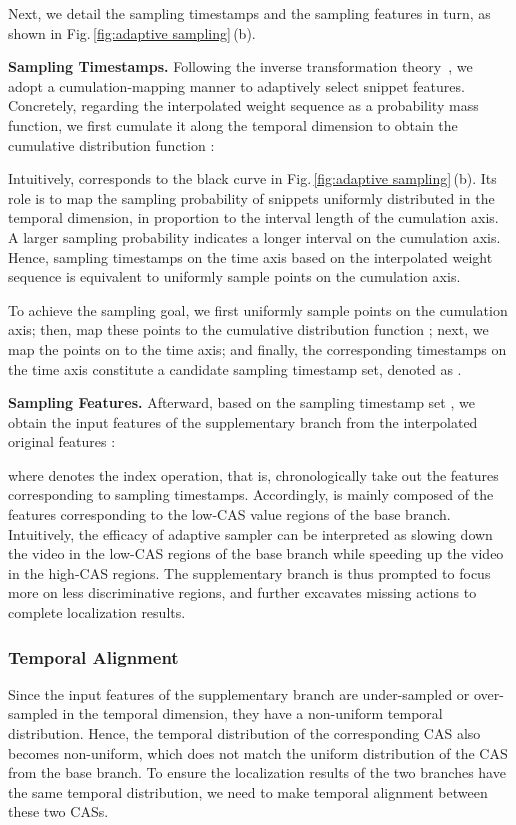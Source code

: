 \documentclass[journal]{IEEEtran}
\begin{document}
Next, we detail the sampling timestamps and the sampling features in turn, as shown in Fig.\,\ref{fig:adaptive sampling}\,(b).


\noindent \textbf{Sampling Timestamps.} Following the inverse transformation theory~\cite{devroye1986sample}, we adopt a cumulation-mapping manner to adaptively select  snippet features. Concretely, regarding the interpolated weight sequence  as a probability mass function, we first cumulate it along the temporal dimension to obtain the cumulative distribution function :

Intuitively,  corresponds to the black curve in Fig.\,\ref{fig:adaptive sampling}\,(b). Its role is to map the sampling probability of  snippets uniformly distributed in the temporal dimension, in proportion to the interval length of the cumulation axis. A larger sampling probability  indicates a longer interval on the cumulation axis. Hence, sampling  timestamps on the time axis based on the interpolated weight sequence  is equivalent to uniformly sample  points on the cumulation axis.




To achieve the sampling goal, we first uniformly sample  points on the cumulation axis; then, map these points to the cumulative distribution function ; next, we map the points on  to the time axis; and finally, the corresponding  timestamps on the time axis constitute a candidate sampling timestamp set, denoted as .



\noindent \textbf{Sampling Features.} Afterward, based on the sampling timestamp set , we obtain the input features of the supplementary branch from the interpolated original features :

where  denotes the index operation, that is, chronologically take out the features corresponding to  sampling timestamps. Accordingly,  is mainly composed of the features corresponding to the low-CAS value regions of the base branch. Intuitively, the efficacy of adaptive sampler can be interpreted as slowing down the video in the low-CAS regions of the base branch while speeding up the video in the high-CAS regions. The supplementary branch is thus prompted to focus more on less discriminative regions, and further excavates missing actions to complete localization results.




\subsubsection{\textbf{Temporal Alignment}}  \label{subsection:Temporal Alignment}
Since the input features of the supplementary branch are under-sampled or over-sampled in the temporal dimension, they have a non-uniform temporal distribution. Hence, the temporal distribution of the corresponding CAS also becomes non-uniform, which does not match the uniform distribution of the CAS from the base branch. To ensure the localization results of the two branches have the same temporal distribution, we need to make temporal alignment between these two CASs.
\end{document}
